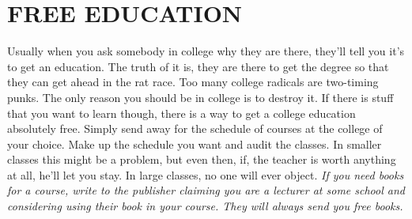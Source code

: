\documentclass[11pt,twoside,a4paper]{book}
\begin{document}

\section{FREE EDUCATION}

Usually when you ask somebody in college why they are there, they'll tell you it's to get an education. The truth of it is, they are there to get the degree so that they can get ahead in the rat race. Too many college radicals are two-timing punks. The only reason you should be in college is to destroy it. If there is stuff that you want to learn though, there is a way to get a college education absolutely free. Simply send away for the schedule of courses at the college of your choice. Make up the schedule you want and audit the classes. In smaller classes this might be a problem, but even then, if, the teacher is worth anything at all, he'll let you stay. In large classes, no one will ever object. \emph{If you need books for a course, write to the publisher claiming you are a lecturer at some school and considering using their book in your course. They will always send you free books. }~\\
\end{document}
